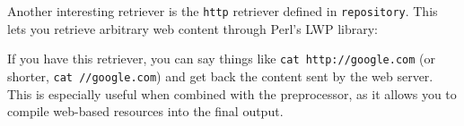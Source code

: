 \documentclass{report}
\begin{document}
    Another interesting retriever is the {\tt http} retriever defined in {\tt repository}. This lets you retrieve arbitrary web content through Perl's LWP library:


    If you have this retriever, you can say things like {\tt cat http://google.com} (or shorter, {\tt cat //google.com}) and get back the content sent by the web server. This is especially
    useful when combined with the preprocessor, as it allows you to compile web-based resources into the final output.
\end{document}
